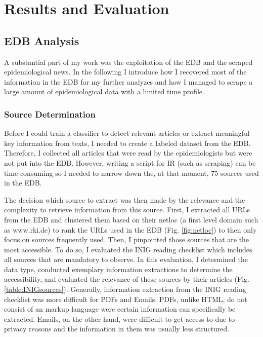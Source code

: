 \chapter{Results and Evaluation}

\section{EDB Analysis}\label{edb analysis}
  A substantial part of my work was the exploitation of the EDB and the scraped epidemiological news.
  In the following I introduce how I recovered most of the information in the EDB for my further analyzes and how I managed to scrape a large amount of epidemiological data with a limited time profile.

\subsection{Source Determination}
  Before I could train a classifier to detect relevant articles or extract meaningful key information from texts, I needed to create a labeled dataset from the EDB.
  Therefore, I collected all articles that were read by the epidemiologists but were not put into the EDB.
  However, writing a script for IR (such as scraping) can be time consuming so I needed to narrow down the, at that moment, 75 sources used in the EDB.

  The decision which source to extract was then made by the relevance and the complexity to retrieve information from this source.
  First, I extracted all URLs from the EDB and clustered them based on their netloc (a first level domain such as www.rki.de) to rank the URLs used in the EDB (Fig. \ref{fig:netloc}) to then only focus on sources frequently used.
  Then, I pinpointed those sources that are the most accessible.
  To do so, I evaluated the INIG reading checklist which includes all sources that are mandatory to observe.
  In this evaluation, I determined the data type, conducted exemplary information extractions to determine the accessibility, and evaluated the relevance of these sources by their articles (Fig. \ref{table:INIGsources}).
  Generally, information extraction from the INIG reading checklist was more difficult for PDFs and Emails.
  PDFs, unlike HTML, do not consist of an markup language were certain information can specifically be extracted.
  Emails, on the other hand, were difficult to get access to due to privacy reasons and the information in them was usually less structured.


